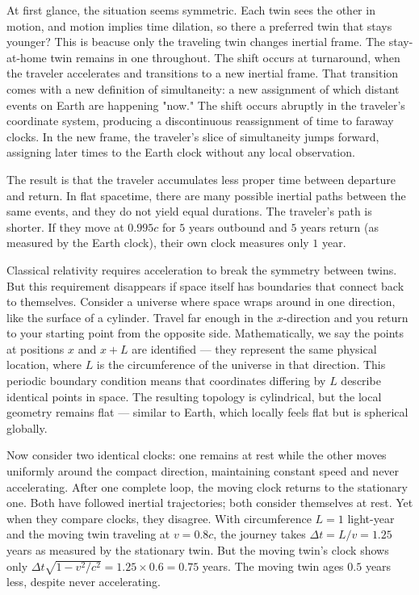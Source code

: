 At first glance, the situation seems symmetric. Each twin sees the other in motion, and motion implies time dilation, so there a preferred twin that stays younger? This is beacuse only the traveling twin changes inertial frame. The stay-at-home twin remains in one throughout. The shift occurs at turnaround, when the traveler accelerates and transitions to a new inertial frame. That transition comes with a new definition of simultaneity: a new assignment of which distant events on Earth are happening "now." The shift occurs abruptly in the traveler's coordinate system, producing a discontinuous reassignment of time to faraway clocks. In the new frame, the traveler's slice of simultaneity jumps forward, assigning later times to the Earth clock without any local observation. 

The result is that the traveler accumulates less proper time between departure and return. In flat spacetime, there are many possible inertial paths between the same events, and they do not yield equal durations. The traveler's path is shorter. If they move at $0.995c$ for $5$ years outbound and $5$ years return (as measured by the Earth clock), their own clock measures only $1$ year. 

Classical relativity requires acceleration to break the symmetry between twins. But this requirement disappears if space itself has boundaries that connect back to themselves. Consider a universe where space wraps around in one direction, like the surface of a cylinder. Travel far enough in the $x$-direction and you return to your starting point from the opposite side. Mathematically, we say the points at positions $x$ and $x + L$ are identified — they represent the same physical location, where $L$ is the circumference of the universe in that direction. This periodic boundary condition means that coordinates differing by $L$ describe identical points in space. The resulting topology is cylindrical, but the local geometry remains flat — similar to Earth, which locally feels flat but is spherical globally.

Now consider two identical clocks: one remains at rest while the other moves uniformly around the compact direction, maintaining constant speed and never accelerating. After one complete loop, the moving clock returns to the stationary one. Both have followed inertial trajectories; both consider themselves at rest. Yet when they compare clocks, they disagree. With circumference $L = 1$ light-year and the moving twin traveling at $v = 0.8c$, the journey takes $\Delta t = L/v = 1.25$ years as measured by the stationary twin. But the moving twin's clock shows only $\Delta t \sqrt{1 - v^2/c^2} = 1.25 \times 0.6 = 0.75$ years. The moving twin ages $0.5$ years less, despite never accelerating.

